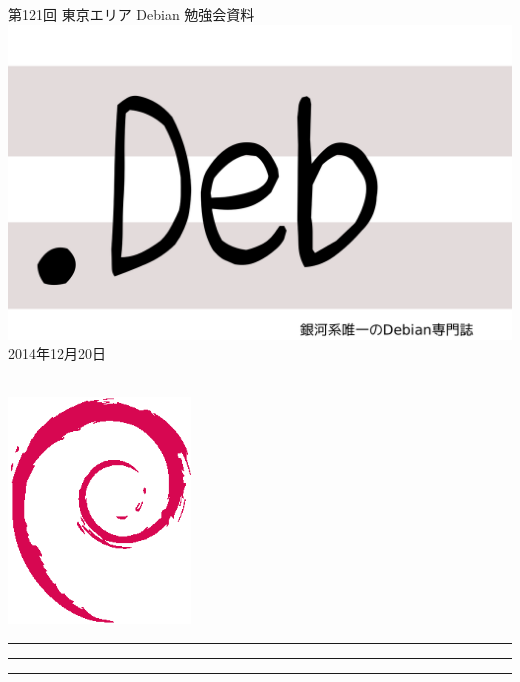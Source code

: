 \documentclass[mingoth,a4paper]{jsarticle}
\newcommand{\debmtgyear}{2014}
\newcommand{\debmtgmonth}{12}
\newcommand{\debmtgdate}{20}
\newcommand{\debmtgnumber}{121}
\begin{document}
\begin{titlepage}
\thispagestyle{empty}

\vspace*{-2cm}
第\debmtgnumber{}回 東京エリア Debian 勉強会資料\\
\hspace*{-2cm}
\includegraphics{image2012-natsu/dotdeb.pdf}\\
\hfill{}\debmtgyear{}年\debmtgmonth{}月\debmtgdate{}日

\\

\vspace*{-2cm}
\hfill{}\includegraphics[height=6cm]{image200502/openlogo-nd.eps}
\end{titlepage}

\newpage

\begin{minipage}[b]{0.2\hsize}
 \colorbox{titleback}{}
\end{minipage}
\begin{minipage}[b]{0.8\hsize}
\hrule
\vspace{2mm}
\hrule
\begin{multicols}{2}
\tableofcontents
\end{multicols}
\vspace{2mm}
\hrule
\end{minipage}
\end{document}
